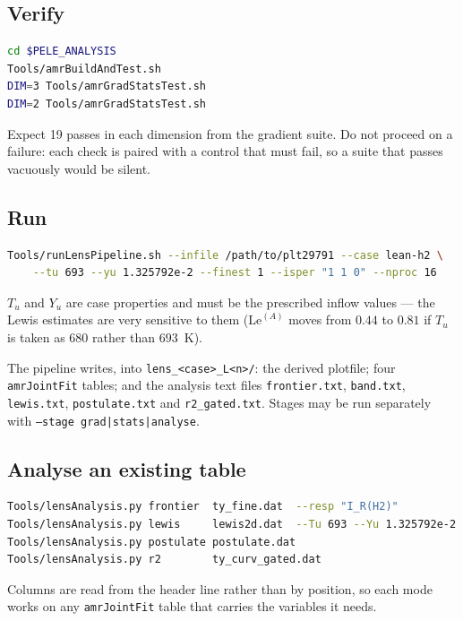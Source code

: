 \documentclass[11pt]{article}
\newcommand{\Le}{\mathrm{Le}}
\begin{document}
\subsection{Verify}

\begin{lstlisting}[language=bash]
cd $PELE_ANALYSIS
Tools/amrBuildAndTest.sh
DIM=3 Tools/amrGradStatsTest.sh
DIM=2 Tools/amrGradStatsTest.sh
\end{lstlisting}

Expect 19 passes in each dimension from the gradient suite. Do not proceed on
a failure: each check is paired with a control that must fail, so a suite that
passes vacuously would be silent.

\subsection{Run}

\begin{lstlisting}[language=bash]
Tools/runLensPipeline.sh --infile /path/to/plt29791 --case lean-h2 \
    --tu 693 --yu 1.325792e-2 --finest 1 --isper "1 1 0" --nproc 16
\end{lstlisting}

$T_u$ and $Y_u$ are case properties and must be the prescribed inflow values
--- the Lewis estimates are very sensitive to them ($\Le^{(A)}$ moves from
$0.44$ to $0.81$ if $T_u$ is taken as $680$ rather than $693$~K).

The pipeline writes, into \texttt{lens\_<case>\_L<n>/}: the derived plotfile;
four \texttt{amrJointFit} tables; and the analysis text files
\texttt{frontier.txt}, \texttt{band.txt}, \texttt{lewis.txt},
\texttt{postulate.txt} and \texttt{r2\_gated.txt}. Stages may be run
separately with \texttt{--stage grad|stats|analyse}.

\subsection{Analyse an existing table}

\begin{lstlisting}[language=bash]
Tools/lensAnalysis.py frontier  ty_fine.dat  --resp "I_R(H2)"
Tools/lensAnalysis.py lewis     lewis2d.dat  --Tu 693 --Yu 1.325792e-2
Tools/lensAnalysis.py postulate postulate.dat
Tools/lensAnalysis.py r2        ty_curv_gated.dat
\end{lstlisting}

\begin{sloppypar}
Columns are read from the header line rather than by position, so each mode
works on any \texttt{amrJointFit} table that carries the variables it needs.
\end{sloppypar}
\end{document}
